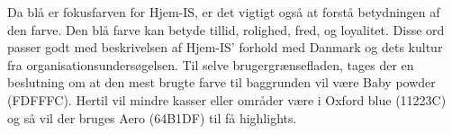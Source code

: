 Da blå er fokusfarven for Hjem-IS, er det vigtigt også at forstå betydningen af den farve. Den blå farve kan betyde tillid, rolighed, fred, og loyalitet. Disse ord passer godt med beskrivelsen af Hjem-IS' forhold med Danmark og dets kultur fra organisationsundersøgelsen. Til selve brugergrænsefladen, tages der en beslutning om at den mest brugte farve til baggrunden vil være Baby powder (FDFFFC). Hertil vil mindre kasser eller områder være i Oxford blue (11223C) og så vil der bruges Aero (64B1DF) til få highlights.
